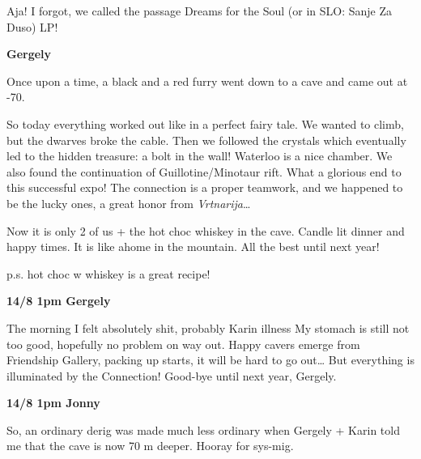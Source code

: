 Aja! I forgot, we called the passage Dreams for the Soul (or in SLO:
Sanje Za Duso) LP!

\textbf{Gergely}

Once upon a time, a black and a red furry went down to a cave and came
out at -70.

So today everything worked out like in a perfect fairy tale. We wanted
to climb, but the dwarves broke the cable. Then we followed the crystals
which eventually led to the hidden treasure: a bolt in the wall!
Waterloo is a nice chamber. We also found the continuation of
Guillotine/Minotaur rift. What a glorious end to this successful expo!
The connection is a proper teamwork, and we happened to be the lucky
ones, a great honor from \emph{Vrtnarija}\ldots{}

Now it is only 2 of us + the hot choc whiskey in the cave. Candle lit
dinner and happy times. It is like ahome in the mountain. All the best
until next year!

p.s. hot choc w whiskey is a great recipe!

\textbf{14/8 1pm Gergely}

The morning I felt absolutely shit, probably Karin illness My stomach is
still not too good, hopefully no problem on way out. Happy cavers emerge
from Friendship Gallery, packing up starts, it will be hard to go
out\ldots{} But everything is illuminated by the Connection! Good-bye
until next year, Gergely.

\textbf{14/8 1pm Jonny}

So, an ordinary derig was made much less ordinary when Gergely + Karin
told me that the cave is now 70 m deeper. Hooray for sys-mig.
